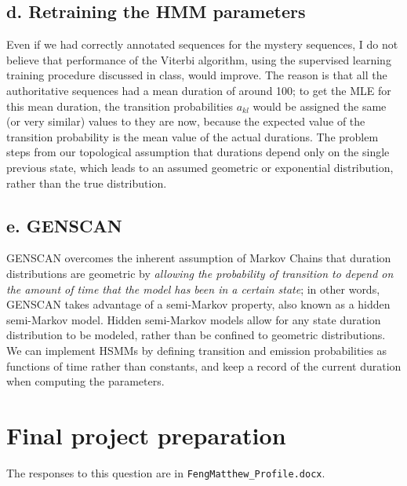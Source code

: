 \documentclass[a4paper]{article}
\begin{document}
\subsection*{d. Retraining the HMM parameters}
Even if we had correctly annotated sequences for the
mystery sequences, I do not believe that performance
of the Viterbi algorithm, using the supervised learning
training procedure discussed in class, would improve.
The reason is that all the authoritative sequences
had a mean duration of around 100; to get the MLE for
this mean duration, the transition probabilities $a_{kl}$
would be assigned the same (or very similar) values to
they are now, because the expected value of the transition
probability is the mean value of the actual durations.
The problem steps from our topological assumption that
durations depend only on the single previous state, which
leads to an assumed geometric or exponential distribution,
rather than the true distribution.

\subsection*{e. GENSCAN}
GENSCAN overcomes the inherent assumption of Markov Chains
that duration distributions are geometric by {\it allowing
the probability of transition to depend on the amount
of time that the model has been in a certain state}; in
other words, GENSCAN takes advantage of a semi-Markov property,
also known as a hidden semi-Markov model. Hidden semi-Markov
models allow for any state duration distribution to be modeled,
rather than be confined to geometric distributions. We can
implement HSMMs by defining transition and emission probabilities
as functions of time rather than constants, and keep a 
record of the current duration when computing the parameters.

\section{Final project preparation}

The responses to this question are in {\tt FengMatthew\_Profile.docx}.
\end{document}
